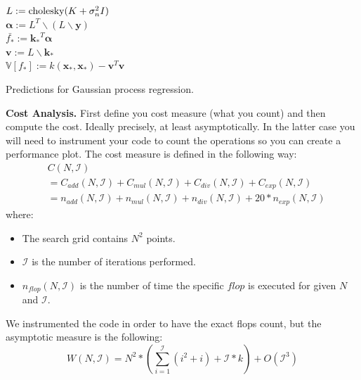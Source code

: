 \documentclass[letterpaper]{article}
\newcommand{\mypar}[1]{{\bf #1.}}
\begin{document}
\begin{algorithm}
    \label{alg:bayesianupdate}
    $L := \textnormal{cholesky}(K+\sigma^2_nI)$\\
    $\mathbf{\alpha}:=L^T\backslash(L\backslash\mathbf{y})$\\
    $\bar{f_*}:=\mathbf{k_*}^T\mathbf{\alpha}$\\
    $\mathbf{v}:=L\backslash\mathbf{k_*}$\\
    $\mathbb{V}[f_*]:=k(\mathbf{x_*}, \mathbf{x_*})-\mathbf{v}^T\mathbf{v}$\\
    \caption{Predictions for Gaussian process regression. \cite{rasmussen2006gaussian}}
\end{algorithm}


\mypar{Cost Analysis}
First define you cost measure (what you count) and then compute the
cost. Ideally precisely, at least asymptotically. In the latter case you will need to instrument your code to count
the operations so you can create a performance plot.
The cost measure is defined in the following way:
\begin{align*}
    &C(N,\mathcal{I})\\
    &=C_{add}(N,\mathcal{I}) + C_{mul}(N,\mathcal{I}) + C_{div}(N,\mathcal{I})+C_{exp}(N,\mathcal{I})\\
    &=n_{add}(N,\mathcal{I}) + n_{mul}(N,\mathcal{I}) + n_{div}(N,\mathcal{I}) + 20*n_{exp}(N,\mathcal{I})
\end{align*}
where:
\begin{itemize}
    \item The search grid contains $N^2$ points.
    \item $\mathcal{I}$ is the number of iterations performed.
    \item $n_{flop}(N,\mathcal{I})$ is the number of time the specific $flop$ is executed for given $N$ and $\mathcal{I}$.
\end{itemize}

We instrumented the code in order to have the exact flops count, but the asymptotic measure is the following:
\begin{equation*}
    W(N, \mathcal{I}) = N^2*\left(\sum_{i=1}^\mathcal{I}(i^2 + i) + \mathcal{I} * k\right) + O(\mathcal{I}^3)
\end{equation*}
\end{document}

